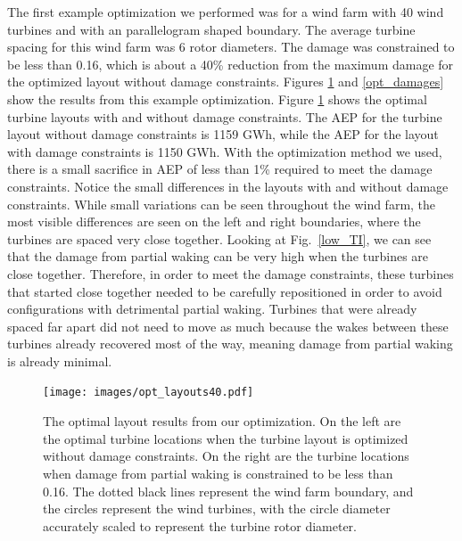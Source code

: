 \documentclass[11pt,letterpaper]{article}
\begin{document}
The first example optimization we performed was for a wind farm with 40 wind turbines and with an parallelogram shaped boundary. The average turbine spacing for this wind farm was 6 rotor diameters. The damage was constrained to be less than 0.16, which is about a 40\% reduction from the maximum damage for the optimized layout without damage constraints.
Figures \ref{layouts} and \ref{opt_damages} show the results from this example optimization. Figure \ref{layouts} shows the optimal turbine layouts with and without damage constraints. The AEP for the turbine layout without damage constraints is 1159 GWh, while the AEP for the layout with damage constraints is 1150 GWh. With the optimization method we used, there is a small sacrifice in AEP of less than 1\% required to meet the damage constraints. Notice the small differences in the layouts with and without damage constraints. 
While small variations can be seen throughout the wind farm, the most visible differences are seen on the left and right boundaries, where the turbines are spaced very close together. Looking at Fig.~\ref{low_TI}, we can see that the damage from partial waking can be very high when the turbines are close together. Therefore, in order to meet the damage constraints, these turbines that started close together needed to be carefully repositioned in order to avoid configurations with detrimental partial waking. Turbines that were already spaced far apart did not need to move as much because the wakes between these turbines already recovered most of the way, meaning damage from partial waking is already minimal.
% 
\begin{figure}
    \centering
    \texttt{[image: images/opt\_layouts40.pdf]}
    \caption{The optimal layout results from our optimization. On the left are the optimal turbine locations when the turbine layout is optimized without damage constraints. On the right are the turbine locations when damage from partial waking is constrained to be less than 0.16. The dotted black lines represent the wind farm boundary, and the circles represent the wind turbines, with the circle diameter accurately scaled to represent the turbine rotor diameter.}
    \label{layouts}
\end{figure}
\end{document}
